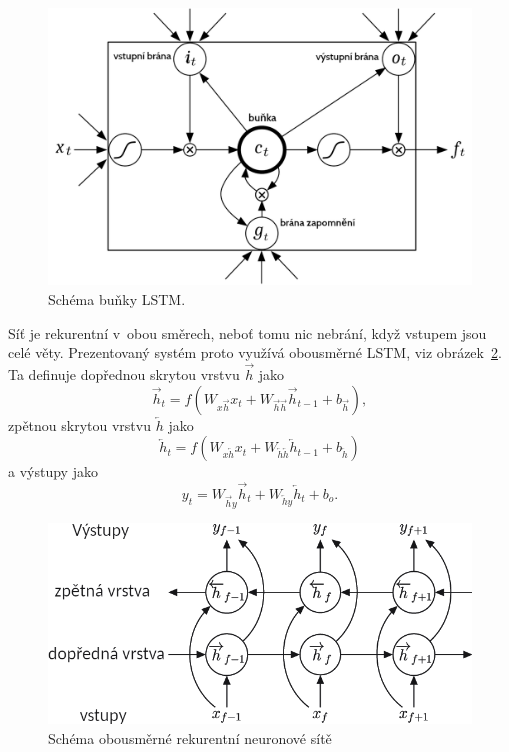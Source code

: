 \begin{figure}[htpb]
\includegraphics[scale=0.7]{rc/lstm.png}
\caption{
    Schéma buňky LSTM.
}
\label{fig:lstm}
\end{figure}

Síť je rekurentní v~obou směrech, neboť tomu nic nebrání, když vstupem jsou celé
věty. Prezentovaný systém proto využívá obousměrné LSTM, viz
obrázek~\ref{fig:birnn}. Ta definuje dopřednou skrytou vrstvu $\overrightarrow{h}$ jako
\begin{equation}
\overrightarrow{h}_t = f(W_{x\overrightarrow{h}}x_t + W_{\overrightarrow{h}\overrightarrow{h}}\overrightarrow{h}_{t-1} + b_{\overrightarrow{h}}),
\end{equation}
zpětnou skrytou vrstvu $\overleftarrow{h}$ jako
\begin{equation}
\overleftarrow{h}_t = f(W_{x\overleftarrow{h}}x_t + W_{\overleftarrow{h}\overleftarrow{h}}\overleftarrow{h}_{t-1} + b_{\overleftarrow{h}})
\end{equation}
a výstupy jako
\begin{equation}
y_t = W_{\overrightarrow{h}y}\overrightarrow{h}_t + W_{\overleftarrow{h}y}\overleftarrow{h}_t + b_o.
\end{equation}

\begin{figure}[htpb]
\includegraphics[scale=0.5]{rc/Bidirectional-recurrent-neural-network-50.png}
\caption{
    Schéma obousměrné rekurentní neuronové sítě
}
\label{fig:birnn}
\end{figure}

